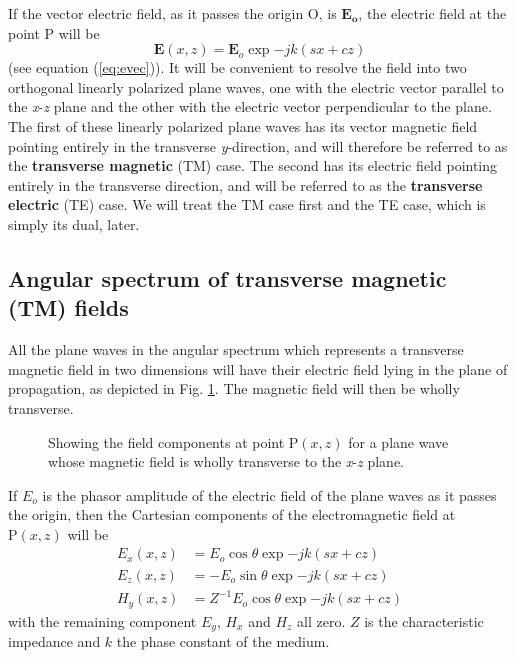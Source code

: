 If the vector electric field, as it passes the origin O, is $\mathbf{E_o}$, the electric field at the point P will be
\begin{equation}
\mathbf{E}(x,z)=\mathbf{E}_o\exp{-jk(sx+cz)}
\end{equation}
(see equation (\ref{eq:evec})). It will be convenient to resolve the field into two orthogonal linearly polarized plane waves, one with the electric vector parallel to the \textit{x}-\textit{z} plane and the other with the electric vector perpendicular to the plane. The first of these linearly polarized plane waves has its vector magnetic field pointing entirely in the transverse \textit{y}-direction, and will therefore be referred to as the \textbf{transverse magnetic} (TM) case. The second has its electric field pointing entirely in the transverse direction, and will be referred to as the \textbf{transverse electric} (TE) case. We will treat the TM case first and the TE case, which is simply its dual, later.

\subsection{Angular spectrum of transverse magnetic (TM) fields}
All the plane waves in the angular spectrum which represents a transverse magnetic field in two dimensions will have their electric field lying in the plane of propagation, as depicted in Fig. \ref{fig:tmcase}. The magnetic field will then be wholly transverse.
\begin{figure}[htbp]
	\begin{center}
	\end{center}
	\caption{Showing the field components at point P$(x,z)$ for a plane wave whose magnetic field is wholly transverse to the \textit{x}-\textit{z} plane.}
	\label{fig:tmcase}
\end{figure}
If $E_o$ is the phasor amplitude of the electric field of the plane waves as it passes the origin, then the Cartesian components of the electromagnetic field at $\text{P}(x, z)$ will be
\begin{equation}
\begin{aligned}
E_x(x,z)&=E_o\cos\theta\exp{-jk(sx+cz)}\\
E_z(x,z)&=-E_o\sin\theta\exp{-jk(sx+cz)}\\
H_y(x,z)&=Z^{-1}E_o\cos\theta\exp{-jk(sx+cz)}
\end{aligned}
\end{equation}
with the remaining component $E_y$, $H_x$ and $H_z$ all zero. $Z$ is the characteristic impedance and $k$ the phase constant of the medium.

